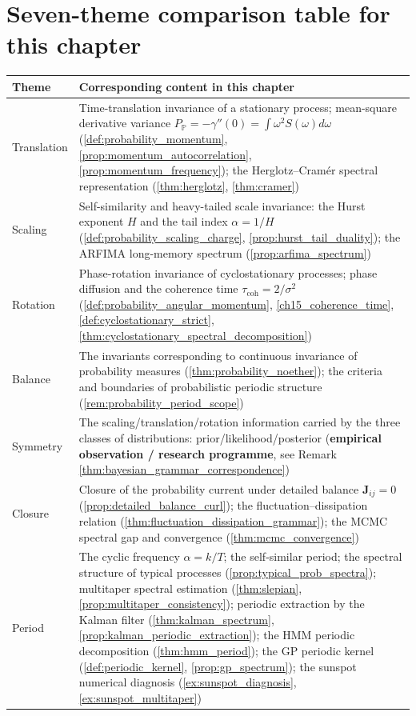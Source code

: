 \section*{Seven-theme comparison table for this chapter}

\begin{center}
\renewcommand{\arraystretch}{1.3}
\begin{tabular}{>{\centering\arraybackslash}p{2.3cm}>{\centering\arraybackslash}p{10.4cm}}
\toprule
Theme & Corresponding content in this chapter \\
\midrule
Translation & Time-translation invariance of a stationary process; mean-square derivative variance $P_{\mathbb P}=-\gamma''(0)=\int\omega^2S(\omega)d\omega$ (\cref{def:probability_momentum}, \cref{prop:momentum_autocorrelation}, \cref{prop:momentum_frequency}); the Herglotz--Cramér spectral representation (\cref{thm:herglotz}, \cref{thm:cramer}) \\
Scaling & Self-similarity and heavy-tailed scale invariance: the Hurst exponent $H$ and the tail index $\alpha=1/H$ (\cref{def:probability_scaling_charge}, \cref{prop:hurst_tail_duality}); the ARFIMA long-memory spectrum (\cref{prop:arfima_spectrum}) \\
Rotation & Phase-rotation invariance of cyclostationary processes; phase diffusion and the coherence time $\tau_{\mathrm{coh}}=2/\sigma^2$ (\cref{def:probability_angular_momentum}, \cref{ch15_coherence_time}, \cref{def:cyclostationary_strict}, \cref{thm:cyclostationary_spectral_decomposition}) \\
Balance & The invariants corresponding to continuous invariance of probability measures (\cref{thm:probability_noether}); the criteria and boundaries of probabilistic periodic structure (\cref{rem:probability_period_scope}) \\
Symmetry & The scaling/translation/rotation information carried by the three classes of distributions: prior/likelihood/posterior (\textbf{empirical observation / research programme}, see Remark \cref{thm:bayesian_grammar_correspondence}) \\
Closure & Closure of the probability current under detailed balance $\mathbf J_{ij}=0$ (\cref{prop:detailed_balance_curl}); the fluctuation--dissipation relation (\cref{thm:fluctuation_dissipation_grammar}); the MCMC spectral gap and convergence (\cref{thm:mcmc_convergence}) \\
Period & The cyclic frequency $\alpha=k/T$; the self-similar period; the spectral structure of typical processes (\cref{prop:typical_prob_spectra}); multitaper spectral estimation (\cref{thm:slepian}, \cref{prop:multitaper_consistency}); periodic extraction by the Kalman filter (\cref{thm:kalman_spectrum}, \cref{prop:kalman_periodic_extraction}); the HMM periodic decomposition (\cref{thm:hmm_period}); the GP periodic kernel (\cref{def:periodic_kernel}, \cref{prop:gp_spectrum}); the sunspot numerical diagnosis (\cref{ex:sunspot_diagnosis}, \cref{ex:sunspot_multitaper}) \\
\bottomrule
\end{tabular}
\end{center}

